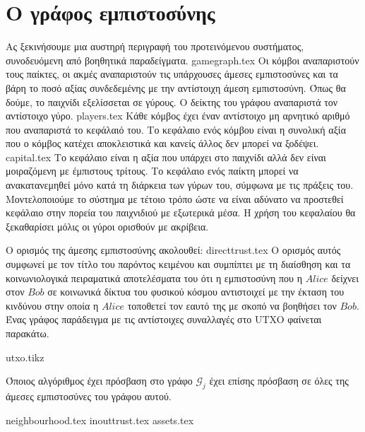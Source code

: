 \section{Ο γράφος εμπιστοσύνης}
  Ας ξεκινήσουμε μια αυστηρή περιγραφή του προτεινόμενου συστήματος, συνοδευόμενη από βοηθητικά παραδείγματα.
  {gamegraph.tex}
  Οι κόμβοι αναπαριστούν τους παίκτες, οι ακμές αναπαριστούν τις υπάρχουσες άμεσες εμπιστοσύνες και τα βάρη το ποσό αξίας
  συνδεδεμένης με την αντίστοιχη άμεση εμπιστοσύνη. Όπως θα δούμε, το παιχνίδι εξελίσσεται σε γύρους. Ο δείκτης του γράφου
  αναπαριστά τον αντίστοιχο γύρο.
  {players.tex}
  Κάθε κόμβος έχει έναν αντίστοιχο μη αρνητικό αριθμό που αναπαριστά το κεφάλαιό του. Το κεφάλαιο ενός κόμβου είναι η συνολική
  αξία που ο κόμβος κατέχει αποκλειστικά και κανείς άλλος δεν μπορεί να ξοδέψει.
  {capital.tex}
  Το κεφάλαιο είναι η αξία που υπάρχει στο παιχνίδι αλλά δεν είναι μοιραζόμενη με έμπιστους τρίτους. Το κεφάλαιο ενός παίκτη
  μπορεί να ανακατανεμηθεί μόνο κατά τη διάρκεια των γύρων του, σύμφωνα με τις πράξεις του. Μοντελοποιούμε το σύστημα με
  τέτοιο τρόπο ώστε να είναι αδύνατο να προστεθεί κεφάλαιο στην πορεία του παιχνιδιού με εξωτερικά μέσα. Η χρήση του κεφαλαίου
  θα ξεκαθαρίσει μόλις οι γύροι ορισθούν με ακρίβεια.

  Ο ορισμός της άμεσης εμπιστοσύνης ακολουθεί:
  {directtrust.tex}
  Ο ορισμός αυτός συμφωνεί με τον τίτλο του παρόντος κειμένου και συμπίπτει με τη διαίσθηση και τα κοινωνιολογικά πειραματικά
  αποτελέσματα του \cite{kmrs} ότι η εμπιστοσύνη που η $Alice$ δείχνει στον $Bob$ σε κοινωνικά δίκτυα του φυσικού κόσμου
  αντιστοιχεί με την έκταση του κινδύνου στην οποία η $Alice$ τοποθετεί τον εαυτό της με σκοπό να βοηθήσει τον $Bob$. Ένας
  γράφος παράδειγμα με τις αντίστοιχες συναλλαγές στο \textlatin{UTXO} φαίνεται παρακάτω.

  {utxo.tikz}

  Όποιος αλγόριθμος έχει πρόσβαση στο γράφο $\mathcal{G}_j$ έχει επίσης πρόσβαση σε όλες της άμεσες εμπιστοσύνες του γράφου
  αυτού.

  {neighbourhood.tex}
  {inouttrust.tex}
  {assets.tex}
